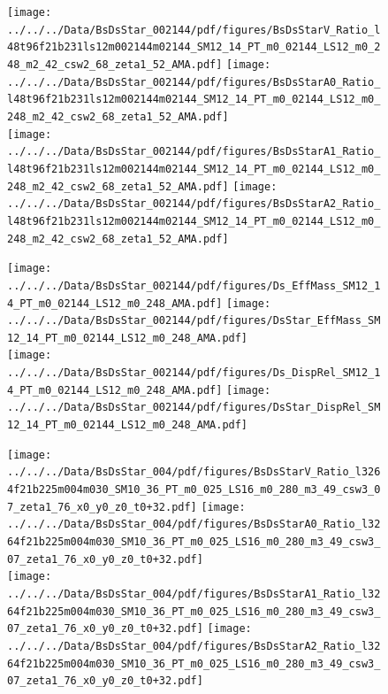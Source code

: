 \documentclass[a4paper,10pt]{article}
\begin{document}
\begin{figure}[p]
 \texttt{[image: ../../../Data/BsDsStar\_002144/pdf/figures/BsDsStarV\_Ratio\_l48t96f21b231ls12m002144m02144\_SM12\_14\_PT\_m0\_02144\_LS12\_m0\_248\_m2\_42\_csw2\_68\_zeta1\_52\_AMA.pdf]}  
\texttt{[image: ../../../Data/BsDsStar\_002144/pdf/figures/BsDsStarA0\_Ratio\_l48t96f21b231ls12m002144m02144\_SM12\_14\_PT\_m0\_02144\_LS12\_m0\_248\_m2\_42\_csw2\_68\_zeta1\_52\_AMA.pdf]} \\ 
\texttt{[image: ../../../Data/BsDsStar\_002144/pdf/figures/BsDsStarA1\_Ratio\_l48t96f21b231ls12m002144m02144\_SM12\_14\_PT\_m0\_02144\_LS12\_m0\_248\_m2\_42\_csw2\_68\_zeta1\_52\_AMA.pdf]}  
\texttt{[image: ../../../Data/BsDsStar\_002144/pdf/figures/BsDsStarA2\_Ratio\_l48t96f21b231ls12m002144m02144\_SM12\_14\_PT\_m0\_02144\_LS12\_m0\_248\_m2\_42\_csw2\_68\_zeta1\_52\_AMA.pdf]} \\ 
\end{figure} 
\clearpage

\begin{figure}[p]
 \texttt{[image: ../../../Data/BsDsStar\_002144/pdf/figures/Ds\_EffMass\_SM12\_14\_PT\_m0\_02144\_LS12\_m0\_248\_AMA.pdf]}  
\texttt{[image: ../../../Data/BsDsStar\_002144/pdf/figures/DsStar\_EffMass\_SM12\_14\_PT\_m0\_02144\_LS12\_m0\_248\_AMA.pdf]} \\ 
\texttt{[image: ../../../Data/BsDsStar\_002144/pdf/figures/Ds\_DispRel\_SM12\_14\_PT\_m0\_02144\_LS12\_m0\_248\_AMA.pdf]}  
\texttt{[image: ../../../Data/BsDsStar\_002144/pdf/figures/DsStar\_DispRel\_SM12\_14\_PT\_m0\_02144\_LS12\_m0\_248\_AMA.pdf]} \\ 
\end{figure} 
\clearpage

\begin{figure}[p]
 \texttt{[image: ../../../Data/BsDsStar\_004/pdf/figures/BsDsStarV\_Ratio\_l3264f21b225m004m030\_SM10\_36\_PT\_m0\_025\_LS16\_m0\_280\_m3\_49\_csw3\_07\_zeta1\_76\_x0\_y0\_z0\_t0+32.pdf]}  
\texttt{[image: ../../../Data/BsDsStar\_004/pdf/figures/BsDsStarA0\_Ratio\_l3264f21b225m004m030\_SM10\_36\_PT\_m0\_025\_LS16\_m0\_280\_m3\_49\_csw3\_07\_zeta1\_76\_x0\_y0\_z0\_t0+32.pdf]} \\ 
\texttt{[image: ../../../Data/BsDsStar\_004/pdf/figures/BsDsStarA1\_Ratio\_l3264f21b225m004m030\_SM10\_36\_PT\_m0\_025\_LS16\_m0\_280\_m3\_49\_csw3\_07\_zeta1\_76\_x0\_y0\_z0\_t0+32.pdf]}  
\texttt{[image: ../../../Data/BsDsStar\_004/pdf/figures/BsDsStarA2\_Ratio\_l3264f21b225m004m030\_SM10\_36\_PT\_m0\_025\_LS16\_m0\_280\_m3\_49\_csw3\_07\_zeta1\_76\_x0\_y0\_z0\_t0+32.pdf]} \\ 
\end{figure} 
\clearpage
\end{document}
